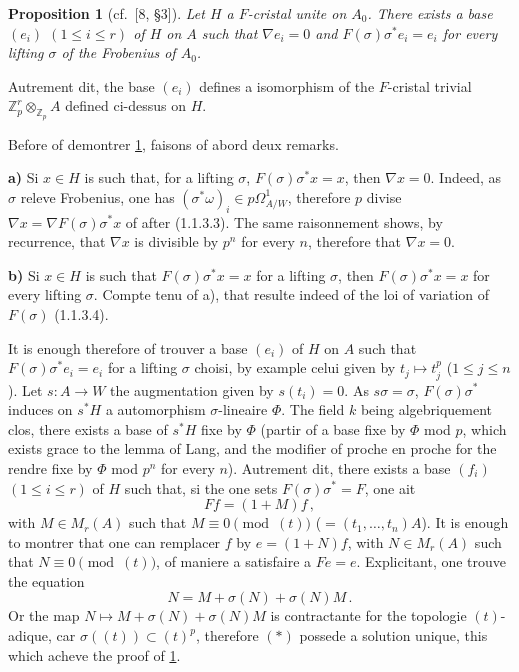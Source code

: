 \documentclass[12pt,a4paper]{article}
\theoremstyle{plain}
\newtheorem{proposition}[theorem]{Proposition}
\theoremstyle{definition}
\theoremstyle{remark}
\begin{document}
\begin{proposition}[{cf.\ [8, \S 3]}]\label{prop:1.2.2}
Let $H$ a $F$-cristal unite on $A_0$. There exists a base $(e_i)$ $(1 \leq i \leq r)$ of $H$ on $A$ such that $\nabla e_i = 0$ and $F(\sigma)\sigma^*e_i = e_i$ for every lifting $\sigma$ of the Frobenius of $A_0$.
\end{proposition}

Autrement dit, the base $(e_i)$ defines a isomorphism of the $F$-cristal trivial $\mathbb{Z}_p^r \otimes_{\mathbb{Z}_p} A$ defined ci-dessus on $H$.

Before of demontrer \ref{prop:1.2.2}, faisons of abord deux remarks.

\textbf{a)} Si $x \in H$ is such that, for a lifting $\sigma$, $F(\sigma)\sigma^*x = x$, then $\nabla x = 0$. Indeed, as $\sigma$ releve Frobenius, one has $(\sigma^*\omega)_i \in p\Omega^1_{A/W}$, therefore $p$ divise $\nabla x = \nabla F(\sigma)\sigma^*x$ of after (1.1.3.3). The same raisonnement shows, by recurrence, that $\nabla x$ is divisible by $p^n$ for every $n$, therefore that $\nabla x = 0$.

\textbf{b)} Si $x \in H$ is such that $F(\sigma)\sigma^*x = x$ for a lifting $\sigma$, then $F(\sigma)\sigma^*x = x$ for every lifting $\sigma$. Compte tenu of a), that resulte indeed of the loi of variation of $F(\sigma)$ (1.1.3.4).

It is enough therefore of trouver a base $(e_i)$ of $H$ on $A$ such that $F(\sigma)\sigma^*e_i = e_i$ for a lifting $\sigma$ choisi, by example celui given by $t_j \mapsto t_j^p$ ($1 \leq j \leq n$). Let $s : A \to W$ the augmentation given by $s(t_i) = 0$. As $s\sigma = \sigma$, $F(\sigma)\sigma^*$ induces on $s^*H$ a automorphism $\sigma$-lineaire $\Phi$. The field $k$ being algebriquement clos, there exists a base of $s^*H$ fixe by $\Phi$ (partir of a base fixe by $\Phi$ mod $p$, which exists grace to the lemma of Lang, and the modifier of proche en proche for the rendre fixe by $\Phi$ mod $p^n$ for every $n$). Autrement dit, there exists a base $(f_i)$ $(1 \leq i \leq r)$ of $H$ such that, si the one sets $F(\sigma)\sigma^* = F$, one ait
\[
Ff = (1+M)f\,,
\]
with $M \in M_r(A)$ such that $M \equiv 0 \pmod{(t)}$ ($= (t_1, \ldots, t_n)A$). It is enough to montrer that one can remplacer $f$ by $e = (1+N)f$, with $N \in M_r(A)$ such that $N \equiv 0 \pmod{(t)}$, of maniere a satisfaire a $Fe = e$. Explicitant, one trouve the equation
\begin{equation}\tag{$*$}
N = M + \sigma(N) + \sigma(N)M\,.
\end{equation}
Or the map $N \mapsto M + \sigma(N) + \sigma(N)M$ is contractante for the topologie $(t)$-adique, car $\sigma((t)) \subset (t)^p$, therefore $(*)$ possede a solution unique, this which acheve the proof of \ref{prop:1.2.2}.
\end{document}
